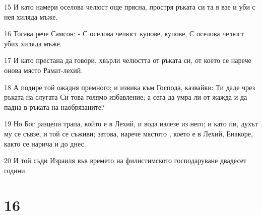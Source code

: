 \par 15 И като намери оселова челюст още прясна, простря ръката си та я взе и уби с нея хиляда мъже.
\par 16 Тогава рече Самсон: - С оселова челюст купове, купове, С оселова челюст убих хиляда мъже.
\par 17 И като престана да говори, хвърли челюстта от ръката си, от което се нарече онова място Рамат-лехий.
\par 18 А подире той ожадня премного; и извика към Господа, казвайки: Ти даде чрез ръката на слугата Си това голямо избавление; а сега да умра ли от жажда и да падна в ръката на наобрязаните?
\par 19 Но Бог разцепи трапа, който е в Лехий, и вода излезе из него; и като пи, духът му се съвзе, и той се съживи; затова, нарече мястото , което е в Лехий, Енакоре, както се нарича и до днес.
\par 20 И той съди Израиля във времето на филистимското господаруване двадесет години.

\chapter{16}

